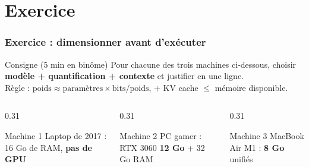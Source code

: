 \documentclass[
	11pt,
	aspectratio=169
]{beamer}
\begin{document}
\section{Exercice}

\begin{frame}
    \frametitle{Exercice : dimensionner avant d'exécuter}
    \begin{block}{\footnotesize Consigne (5 min en binôme)}
        Pour chacune des trois machines ci-dessous, choisir \textbf{modèle + quantification + contexte} et justifier en une ligne. \\ Règle : $\text{poids} \approx \text{paramètres} \times \text{bits/poids}$, $+$ KV cache $\le$ mémoire disponible.
    \end{block}
    \vspace{0.3cm}
    \begin{columns}[t]
        \begin{column}{0.31\textwidth}
            \begin{exampleblock}{\footnotesize Machine 1}
                \scriptsize Laptop de 2017 : 16 Go de RAM, \textbf{pas de GPU}
            \end{exampleblock}
        \end{column}
        \begin{column}{0.31\textwidth}
            \begin{exampleblock}{\footnotesize Machine 2}
                \scriptsize PC gamer : RTX 3060 \textbf{12 Go} + 32 Go RAM
            \end{exampleblock}
        \end{column}
        \begin{column}{0.31\textwidth}
            \begin{exampleblock}{\footnotesize Machine 3}
                \scriptsize MacBook Air M1 : \textbf{8 Go} unifiés
            \end{exampleblock}
        \end{column}
    \end{columns}
\end{frame}
\end{document}
